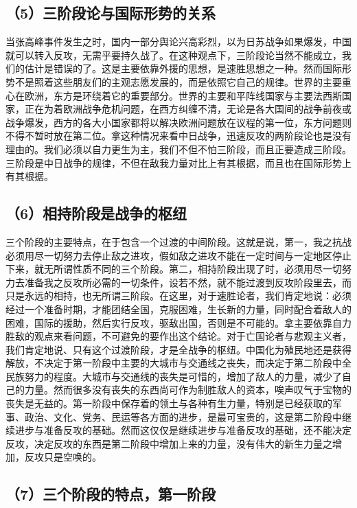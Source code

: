 \subsection{（5）三阶段论与国际形势的关系}

当张高峰事件发生之时，国内一部分舆论兴高彩烈，以为日苏战争如果爆发，中国就可以转入反攻，无需乎要持久战了。在这种观点下，三阶段论当然不能成立，我们的估计是错误的了。这是主要依靠外援的思想，是速胜思想之一种。然而国际形势不是照着这些朋友们的主观志愿发展的，而是依照它自己的规律。世界的主要重心在欧洲，东方是环绕着它的重要部分。世界的主要和平阵线国家与主要法西斯国家，正在为着欧洲战争危机问题，在西方纠缠不清，无论是各大国间的战争前夜或战争爆发，西方的各大小国家都将以解决欧洲问题放在议程的第一位，东方问题则不得不暂时放在第二位。拿这种情况来看中日战争，迅速反攻的两阶段论也是没有理由的。我们必须以自力更生为主，我们不但不怕三阶段，而且正要造成三阶段。三阶段是中日战争的规律，不但在敌我力量对比上有其根据，而且也在国际形势上有其根据。

\subsection{（6）相持阶段是战争的枢纽}

三个阶段的主要特点，在于包含一个过渡的中间阶段。这就是说，第一，我之抗战必须用尽一切努力去停止敌之进攻，假如敌之进攻不能在一定时间与一定地区停止下来，就无所谓性质不同的三个阶段。第二，相持阶段出现了时，必须用尽一切努力去准备我之反攻所必需的一切条件，设若不然，就不能过渡到反攻阶段里去，而只是永远的相持，也无所谓三阶段。在这里，对于速胜论者，我们肯定地说：必须经过一个准备时期，才能团结全国，克服困难，生长新的力量，同时配合着敌人的困难，国际的援助，然后实行反攻，驱敌出国，否则是不可能的。拿主要依靠自力胜敌的观点来看问题，不可避免的要作出这个结论。对于亡国论者与悲观主义者，我们肯定地说、只有这个过渡阶段，才是全战争的枢纽。中国化为殖民地还是获得解放，不决定于第一阶段中主要的大城市与交通线之丧失，而决定于第二阶段中全民族努力的程度。大城市与交通线的丧失是可惜的，增加了敌人的力量，减少了自己的力量。然而很多没有丧失的东西尚可作为制胜敌人的资本，唉声叹气于宝物的丧失是无益的。第一阶段中保存着的领土与各种有生力量，特别是已经获取的军事、政治、文化、党务、民运等各方面的进步，是最可宝贵的，这是第二阶段中继续进步与准备反攻的基础。然而这仅仅是继续进步与准备反攻的基础，还不能决定反攻，决定反攻的东西是第二阶段中增加上来的力量，没有伟大的新生力量之增加，反攻只是空唤的。

\subsection{（7）三个阶段的特点，第一阶段}

